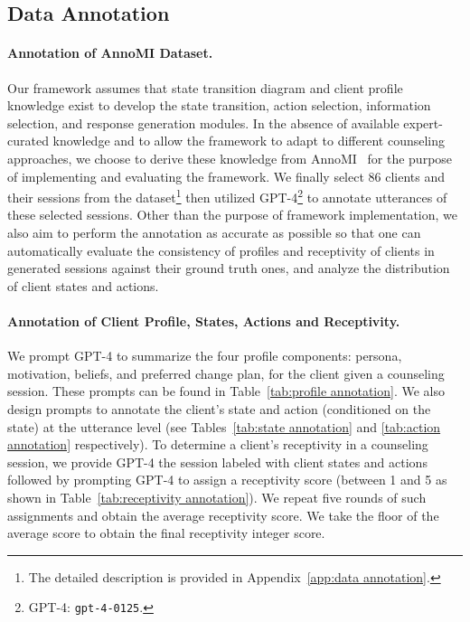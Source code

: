 \subsection{Data Annotation}
\label{sec:data annotation}

\paragraph{Annotation of AnnoMI Dataset.} Our framework assumes that state transition diagram and client profile knowledge exist to develop the state transition, action selection, information selection, and response generation modules. In the absence of available expert-curated knowledge and to allow the framework to adapt to different counseling approaches, we choose to derive these knowledge from AnnoMI~\citep{wu2022anno} for the purpose of implementing and evaluating the framework. We finally select 86 clients and their sessions from the dataset\footnote{The detailed description is provided in Appendix~\ref{app:data annotation}.} then utilized GPT-4\footnote{GPT-4: \texttt{gpt-4-0125}.} to annotate utterances of these selected sessions.
Other than the purpose of framework implementation, we also aim to perform the annotation as accurate as possible so that one can automatically evaluate the consistency of profiles and receptivity of clients in generated sessions against their ground truth ones, and analyze the distribution of client states and actions.

\paragraph{Annotation of Client Profile, States, Actions and Receptivity.} We prompt GPT-4 to summarize the four profile components: persona, motivation, beliefs, and preferred change plan, for the client given a counseling session. These prompts can be found in Table~\ref{tab:profile annotation}.  We also design prompts to annotate the client's state and action (conditioned on the state) at the utterance level (see Tables~\ref{tab:state annotation} and \ref{tab:action annotation} respectively). To determine a client's receptivity in a counseling session, we provide GPT-4 the session labeled with client states and actions followed by prompting GPT-4 to assign a receptivity score (between 1 and 5 as shown in Table~\ref{tab:receptivity annotation}). We repeat five rounds of such assignments and obtain the average receptivity score. We take the floor of the average score to obtain the final receptivity integer score. 

